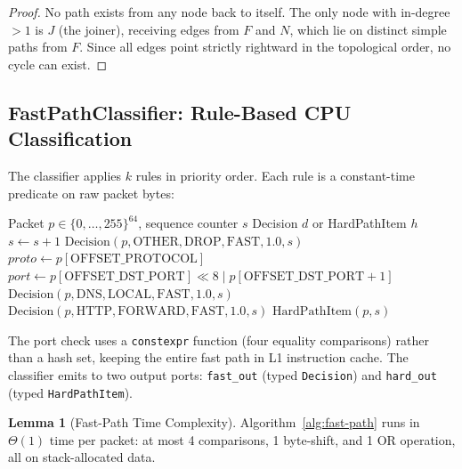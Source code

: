 \documentclass[11pt,a4paper,twoside]{article}
\theoremstyle{definition}
\newtheorem{lemma}[theorem]{Lemma}
\theoremstyle{remark}
\begin{document}
\begin{proof}
No path exists from any node back to itself. The only node with in-degree $> 1$ is $J$ (the joiner), receiving edges from $F$ and $N$, which lie on distinct simple paths from $F$. Since all edges point strictly rightward in the topological order, no cycle can exist.
\end{proof}

\subsection{FastPathClassifier: Rule-Based CPU Classification}

The classifier applies $k$ rules in priority order. Each rule is a constant-time predicate on raw packet bytes:

\begin{algorithm}[H]
\caption{\textsc{FastPathClassify}$(p)$: CPU fast-path decision}
\label{alg:fast-path}
\begin{algorithmic}[1]
\Require Packet $p \in \{0,\ldots,255\}^{64}$, sequence counter $s$
\Ensure Decision $d$ or HardPathItem $h$
\State $s \gets s + 1$
  \State \Return $\text{Decision}(p, \text{OTHER}, \text{DROP}, \text{FAST}, 1.0, s)$
\EndIf
\State $\textit{proto} \gets p[\text{OFFSET\_PROTOCOL}]$
\State $\textit{port} \gets p[\text{OFFSET\_DST\_PORT}] \ll 8 \mathbin{|} p[\text{OFFSET\_DST\_PORT}+1]$
  \State \Return $\text{Decision}(p, \text{DNS}, \text{LOCAL}, \text{FAST}, 1.0, s)$
\EndIf
{}
  \State \Return $\text{Decision}(p, \text{HTTP}, \text{FORWARD}, \text{FAST}, 1.0, s)$
\EndIf
\State \Return $\text{HardPathItem}(p, s)$ 
\end{algorithmic}
\end{algorithm}

The port check uses a \texttt{constexpr} function (four equality comparisons) rather than a hash set, keeping the entire fast path in L1 instruction cache. The classifier emits to two output ports: \texttt{fast\_out} (typed \texttt{Decision}) and \texttt{hard\_out} (typed \texttt{HardPathItem}).

\begin{lemma}[Fast-Path Time Complexity]
\label{lem:fast-path-time}
Algorithm~\ref{alg:fast-path} runs in $\Theta(1)$ time per packet: at most 4 comparisons, 1 byte-shift, and 1 OR operation, all on stack-allocated data.
\end{lemma}
\end{document}
